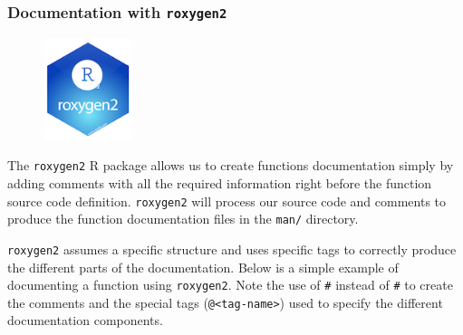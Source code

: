 \documentclass[
  11pt,
]{book}
\begin{document}
\hypertarget{documentation-roxygen}{%
\subsubsection{\texorpdfstring{Documentation with \texttt{roxygen2}}{Documentation with roxygen2}}\label{documentation-roxygen}}

\begin{figure}
  \vspace*{-15pt}
  \begin{center}
    \includegraphics[width=0.23\textwidth]{images/coding/roxygen2.png}
  \end{center}
  \vspace{-15pt}
\end{figure}

The \texttt{roxygen2} R package allows us to create functions documentation simply by adding comments with all the required information right before the function source code definition. \texttt{roxygen2} will process our source code and comments to produce the function documentation files in the \texttt{man/} directory.

\texttt{roxygen2} assumes a specific structure and uses specific tags to correctly produce the different parts of the documentation. Below is a simple example of documenting a function using \texttt{roxygen2}. Note the use of \texttt{\#\textquotesingle{}} instead of \texttt{\#} to create the comments and the special tags (\texttt{@\textless{}tag-name\textgreater{}}) used to specify the different documentation components.
\end{document}
